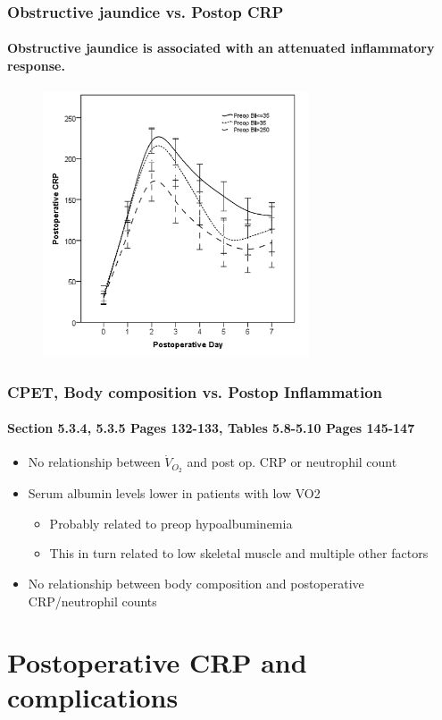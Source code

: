 \documentclass[10pt]{beamer}
\begin{document}
\begin{frame}
	\frametitle{Obstructive jaundice vs. Postop CRP}
	\framesubtitle{Obstructive jaundice is associated with an attenuated inflammatory response.}
	\begin{figure}
		\includegraphics[width=0.7\textwidth]{../Figures/sirs_bil_crp}
	\end{figure}

\end{frame}

\begin{frame}
	\frametitle{CPET, Body composition vs. Postop Inflammation }
	\framesubtitle{Section 5.3.4, 5.3.5 Pages 132-133, Tables 5.8-5.10 Pages 145-147 }
	\begin{itemize}
		\item No relationship between $\dot{V}_{O_2}$ and post op. CRP or neutrophil count
		\vfill
		\item Serum albumin levels lower in patients with low VO2
		\begin{itemize}
			\item Probably related to preop hypoalbuminemia
			\item This in turn related to low skeletal muscle and multiple other factors
		\end{itemize}
		\vfill
		\item No relationship between body composition and postoperative CRP/neutrophil counts
	\end{itemize}
\end{frame}


\section[Chapter 6]{Postoperative CRP and complications}
\end{document}
